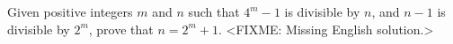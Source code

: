 \problem{}
Given positive integers $m$ and $n$ such that $4^m - 1$ is divisible by $n$, and $n - 1$ is divisible by $2^m$, prove that $n = 2^m + 1$.
\solution
<FIXME: Missing English solution.>
\endproblem
